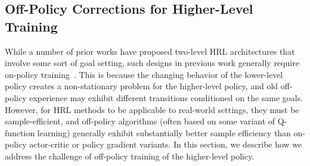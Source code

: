 \documentclass{article}
\newcommand{\comment}[1]{}
\begin{document}
\comment{
Using the relabeling trick introduced in hindsight experience replay (HER)~\cite{andrychowicz2017hindsight}, the loss objective for learning the value function $Q_\theta(s_t,a_t,g_t)$ for a parameterized reward $r(s_t,a_t,g_t)$ is given by,  
\begin{align}
& L(w) = \mathbb{E}_{(s_t,a_t,s_{t+1})\sim \beta, g_t\sim p(g_t|s_t,a_t,s_{t+1})}\left[ \left( Q_\theta(s_t,a_t,g_t)  - y(s_t,a_t,s_{t+1},g_t))\right)^2 \right] \\
& y(s_t,a_t,s_{t+1},g_t) = r(s_t,a_t,s_{t+1},g_t) + \gamma \max_{a} Q_\theta (s_{t+1},a, g_t), 
\end{align}
where $p(g_t|s_{t},a_t,s_{t+1})$ defines the relabeling distribution. 

$Q_\theta(s,a,g_t)$ therefore can be learned using all transition samples from any policy, and defines an infinite set of low-level policies given by $\mu_w(s_t,g) = \arg\max_a Q_\theta(s_t,a,g_t) $ that be used by the high-level policy. To optimize for sample efficiency, we also use off-policy TD learning to learn for the high-level policy, jointly optimized with the low-level policies. The high-level policy operates at a lower temporal resolution, e.g. every $c$ time steps. The loss objective for the high-level policy is given by,
\begin{align}
& L(\phi) = \mathbb{E}_{(s_t,g_t,s_{t+c})\sim \beta}\left[ \left( Q_\phi(s_t,g_t)  - y(s_t,g_t, s_{t+c}))\right)^2 \right] \\
& y(s_t,g_t,s_{t+c}) = R(s_t,g_t,s_{t+c}) + \gamma \max_{g} Q_\phi (s_{t+c},g), 
\end{align}
}
\subsection{Off-Policy Corrections for Higher-Level Training}
While a number of prior works have proposed two-level HRL architectures that involve some sort of goal setting, such designs in previous work generally require on-policy training~\cite{vezhnevets2017feudal}. This is because the changing behavior of the lower-level policy creates a non-stationary problem for the higher-level policy, and old off-policy experience may exhibit different transitions conditioned on the same goals. However, for HRL methods to be applicable to real-world settings, they must be sample-efficient, and off-policy algorithms (often based on some variant of Q-function learning) generally exhibit substantially better sample efficiency than on-policy actor-critic or policy gradient variants. In this section, we describe how we address the challenge of off-policy training of the higher-level policy.
\end{document}
